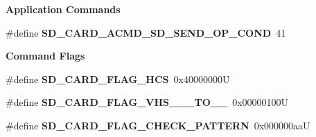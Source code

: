 \begin{Indent}\textbf{ Application Commands}\par
\begin{DoxyCompactItemize}
\item 
\mbox{\label{spi-sd-card_8c_a67a2540fc6fdaa8d4ff5dac9efb11eca}} 
\#define {\bfseries S\+D\+\_\+\+C\+A\+R\+D\+\_\+\+A\+C\+M\+D\+\_\+\+S\+D\+\_\+\+S\+E\+N\+D\+\_\+\+O\+P\+\_\+\+C\+O\+ND}~41
\end{DoxyCompactItemize}
\end{Indent}
\begin{Indent}\textbf{ Command Flags}\par
\begin{DoxyCompactItemize}
\item 
\mbox{\label{spi-sd-card_8c_a79e01e23041bfc274d3b3b334847fd27}} 
\#define {\bfseries S\+D\+\_\+\+C\+A\+R\+D\+\_\+\+F\+L\+A\+G\+\_\+\+H\+CS}~0x40000000U
\item 
\mbox{\label{spi-sd-card_8c_a17be5454526e26f84aa570fb9a48cb88}} 
\#define {\bfseries S\+D\+\_\+\+C\+A\+R\+D\+\_\+\+F\+L\+A\+G\+\_\+\+V\+H\+S\+\_\+\_\+\_\+\+T\+O\+\_\+\_}~0x00000100U
\item 
\mbox{\label{spi-sd-card_8c_a06b512912109284bcb6644b2e07d4c1b}} 
\#define {\bfseries S\+D\+\_\+\+C\+A\+R\+D\+\_\+\+F\+L\+A\+G\+\_\+\+C\+H\+E\+C\+K\+\_\+\+P\+A\+T\+T\+E\+RN}~0x000000aaU
\end{DoxyCompactItemize}
\end{Indent}
